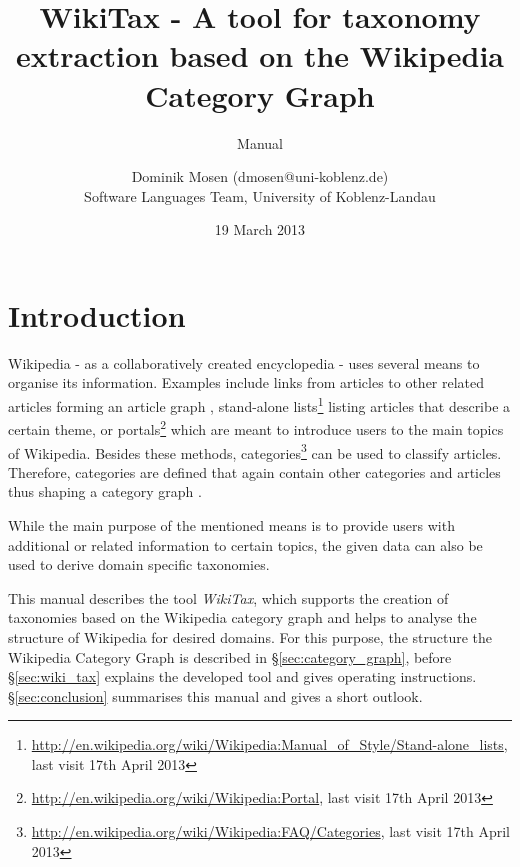 \documentclass{scrartcl}
\title{WikiTax - A tool for taxonomy extraction based on the Wikipedia Category Graph}
\subtitle{Manual}
\author{Dominik Mosen (dmosen@uni-koblenz.de)\\Software Languages Team, University of Koblenz-Landau}
\date{19 March 2013}
\begin{document}
\maketitle


\section{Introduction}

Wikipedia - as a collaboratively created encyclopedia - uses several means to organise its information. Examples include links from articles to other related articles forming an article graph \cite{ZeschGurevych2007analysis}, stand-alone lists\footnote{\url{http://en.wikipedia.org/wiki/Wikipedia:Manual_of_Style/Stand-alone_lists}, last visit 17th April 2013} listing articles that describe a certain theme, or portals\footnote{\url{http://en.wikipedia.org/wiki/Wikipedia:Portal}, last visit 17th April 2013} which are meant to introduce users to the main topics of Wikipedia. Besides these methods, categories\footnote{\url{http://en.wikipedia.org/wiki/Wikipedia:FAQ/Categories}, last visit 17th April 2013} can be used to classify articles. Therefore, categories are defined that again contain other categories and articles thus shaping a category graph \cite{ZeschGurevych2007analysis}. 

While the main purpose of the mentioned means is to provide users with additional or related information to certain topics, the given data can also be used to derive domain specific taxonomies.

This manual describes the tool \emph{WikiTax}, which supports the creation of taxonomies based on the Wikipedia category graph and helps to analyse the structure of Wikipedia for desired domains. For this purpose, the structure the Wikipedia Category Graph is described in §\ref{sec:category_graph}, before §\ref{sec:wiki_tax} explains the developed tool and gives operating instructions. §\ref{sec:conclusion} summarises this manual and gives a short outlook.
\end{document}

